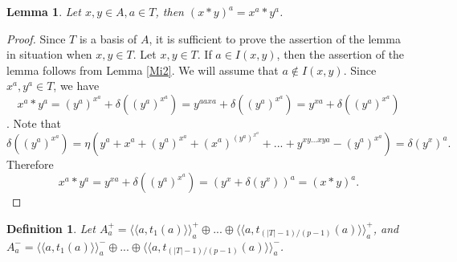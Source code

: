\documentclass[12pt]{article}
\newcommand\dl{\delta}
\newcommand\la{\langle}
\newcommand\ra{\rangle}
\newcommand\lla{\la\!\la}
\newcommand\rra{\ra\!\ra}
\newtheorem{lem}{Lemma}
\newtheorem{defi}{Definition}
\begin{document}
\begin{lem}\label{aaut}
	Let $x,y\in A, a\in T$, then $(x*y)^a=x^a*y^a$.
\end{lem}
\begin{proof}
Since $T$ is a basis of $A$, it is sufficient to prove the assertion of the lemma in situation when $x,y\in T$. Let $x,y\in T$. If $a\in I(x,y)$, then the assertion of the lemma follows from Lemma \ref{Mi2}. We will assume that $a\not\in I(x,y)$.
	Since $x^a, y^a\in T$, we have $$x^a*y^a=(y^a)^{x^a}+\dl((y^a)^{x^a})=y^{aaxa}+\dl((y^a)^{x^a})=y^{xa}+\dl((y^a)^{x^a})$$. Note that $$\dl((y^a)^{x^a})=\eta(y^a+x^a+(y^a)^{x^a}+(x^a)^{(y^a)^{x^a}}+...+ y^{xy...xya}-(y^a)^{x^a})=\dl(y^x)^a.$$
	Therefore
	$$x^a*y^a=y^{xa}+\dl((y^a)^{x^a})=(y^x+\dl(y^x))^a=(x*y)^a.$$ 
\end{proof}


\begin{defi}
 Let $A^+_a= \lla a,t_1(a)\rra_a^+\oplus...\oplus\lla a,t_{(|T|-1)/(p-1)}(a)\rra_a^+$, 
		and $A^-_a=\lla a,t_1(a)\rra_a^-\oplus...\oplus\lla a,t_{(|T|-1)/(p-1)}(a)\rra_a^-$. 
\end{defi}
\end{document}
